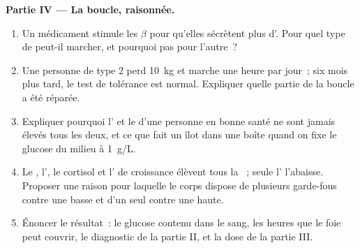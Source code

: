 \begin{problem}
\medskip
\noindent\textbf{Partie IV --- La boucle, raisonnée.}
\begin{enumerate}[resume]
  \item Un médicament stimule les  $\beta$ pour qu'elles
        sécrètent plus d'. Pour quel type de  peut-il
        marcher, et pourquoi pas pour l'autre~?
  \item Une personne de type 2 perd \qty{10}{kg} et marche une heure
        par jour~; six mois plus tard, le test de tolérance est
        normal. Expliquer quelle partie de la boucle a été réparée.
  \item Expliquer pourquoi l' et le  d'une personne en
        bonne santé ne sont jamais élevés tous les deux, et ce que
        fait un îlot dans une boîte quand on fixe le glucose du milieu
        à \qty{1}{g/L}.
  \item Le , l', le cortisol et l' de
        croissance élèvent tous la ~; seule l'
        l'abaisse. Proposer une raison pour laquelle le corps dispose
        de plusieurs garde-fous contre une  basse et d'un seul
        contre une  haute.
  \item Énoncer le résultat~: le glucose contenu dans le sang, les
        heures que le foie peut couvrir, le diagnostic de la partie
        II, et la dose de la partie III.
\end{enumerate}
\end{problem}
